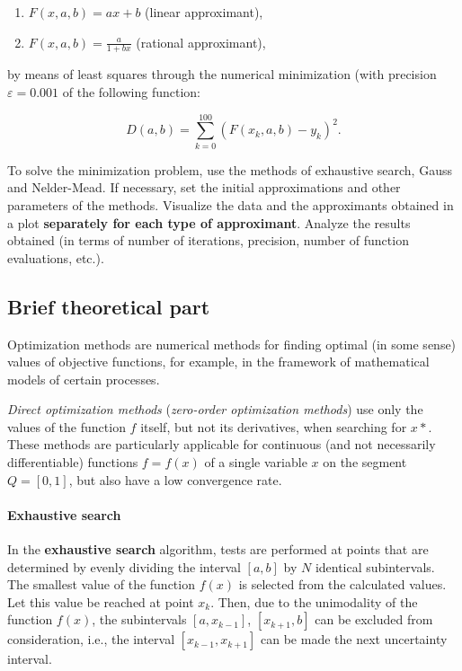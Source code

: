 \begin{enumerate}
    \item $F(x, a, b) = ax + b$ (linear approximant),
    \item $F(x, a, b) = \frac{a}{1 + bx}$ (rational approximant),
\end{enumerate}

by means of least squares through the numerical minimization (with precision $\varepsilon = 0.001$ of the following function:

\begin{equation}
    D(a, b) = \sum^{100}_{k=0}(F(x_k, a, b) - y_k)^2.
\end{equation}

To solve the minimization problem, use the methods of exhaustive search, Gauss and Nelder-Mead.
If necessary, set the initial approximations and other parameters of
the methods.
Visualize the data and the approximants obtained in a plot \textbf{separately for each type of approximant}.
Analyze the results obtained (in terms of number of iterations, precision, number of function evaluations, etc.).

\subsection{Brief theoretical part}

Optimization methods are numerical methods for finding optimal (in some sense) values of objective functions, for example, in the framework of mathematical models of certain processes.

\textit{Direct optimization methods} (\textit{zero-order optimization methods}) use only the values of the function $f$ itself, but not its derivatives, when searching for $x*$.
These methods are particularly applicable for continuous (and not necessarily differentiable) functions $f = f(x)$ of a single variable $x$ on the segment $Q = [0, 1]$, but also have a low convergence rate.

\paragraph{Exhaustive search}

In the \textbf{exhaustive search} algorithm, tests are performed at points that are determined by evenly dividing the interval $[a, b]$ by $N$ identical subintervals.
The smallest value of the function $f(x)$ is selected from the calculated values.
Let this value be reached at point $x_k$.
Then, due to the unimodality of the function $f(x)$, the subintervals $[a, x_{k-1}]$, $[x_{k+1}, b]$ can be excluded from consideration, i.e., the interval $[x_{k-1}, x_{k+1}]$ can be made the next uncertainty interval.

